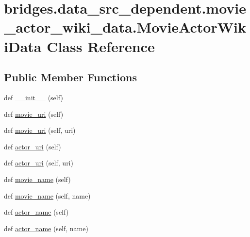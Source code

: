 \hypertarget{classbridges_1_1data__src__dependent_1_1movie__actor__wiki__data_1_1_movie_actor_wiki_data}{}\section{bridges.\+data\+\_\+src\+\_\+dependent.\+movie\+\_\+actor\+\_\+wiki\+\_\+data.\+Movie\+Actor\+Wiki\+Data Class Reference}
\label{classbridges_1_1data__src__dependent_1_1movie__actor__wiki__data_1_1_movie_actor_wiki_data}
\subsection*{Public Member Functions}
\begin{DoxyCompactItemize}
\item 
def \mbox{\hyperlink{classbridges_1_1data__src__dependent_1_1movie__actor__wiki__data_1_1_movie_actor_wiki_data_a9f1d5ab83dd834e7cebfeb195b0c2c80}{\+\_\+\+\_\+init\+\_\+\+\_\+}} (self)
\item 
def \mbox{\hyperlink{classbridges_1_1data__src__dependent_1_1movie__actor__wiki__data_1_1_movie_actor_wiki_data_ae2931df20e7bbd6afead98918c57f8eb}{movie\+\_\+uri}} (self)
\item 
def \mbox{\hyperlink{classbridges_1_1data__src__dependent_1_1movie__actor__wiki__data_1_1_movie_actor_wiki_data_ae9e09370897da0ed4daa3a9378907b50}{movie\+\_\+uri}} (self, uri)
\item 
def \mbox{\hyperlink{classbridges_1_1data__src__dependent_1_1movie__actor__wiki__data_1_1_movie_actor_wiki_data_a7f0c73452d586c0eb037b4e1c53efcba}{actor\+\_\+uri}} (self)
\item 
def \mbox{\hyperlink{classbridges_1_1data__src__dependent_1_1movie__actor__wiki__data_1_1_movie_actor_wiki_data_afaf6adac7e472a88852551cc8650b391}{actor\+\_\+uri}} (self, uri)
\item 
def \mbox{\hyperlink{classbridges_1_1data__src__dependent_1_1movie__actor__wiki__data_1_1_movie_actor_wiki_data_aa76d0a5fb3b3ce8f7209ddf9efabb1cb}{movie\+\_\+name}} (self)
\item 
def \mbox{\hyperlink{classbridges_1_1data__src__dependent_1_1movie__actor__wiki__data_1_1_movie_actor_wiki_data_aea5e460c9e8f74f56b0a70c4ef3f834a}{movie\+\_\+name}} (self, name)
\item 
def \mbox{\hyperlink{classbridges_1_1data__src__dependent_1_1movie__actor__wiki__data_1_1_movie_actor_wiki_data_a7fcdb04a061044e590601c2298cf8b5d}{actor\+\_\+name}} (self)
\item 
def \mbox{\hyperlink{classbridges_1_1data__src__dependent_1_1movie__actor__wiki__data_1_1_movie_actor_wiki_data_a00c9cd99fb43f7bdc32e28b1ad9a91db}{actor\+\_\+name}} (self, name)
\end{DoxyCompactItemize}



